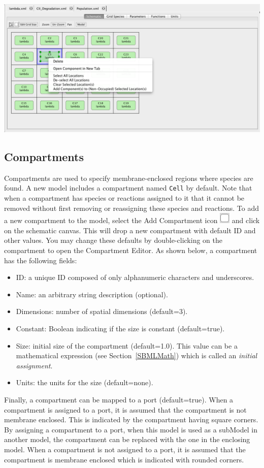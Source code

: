 \documentclass[titlepage,11pt]{article}
\begin{document}
\begin{center}
\includegraphics[width=140mm]{screenshots/gridRightButton}
\end{center}

\subsection{\label{Compartments}Compartments}

\noindent
Compartments are used to specify membrane-enclosed regions where species are found. A new model includes a compartment named {\tt Cell} by default.  Note that when a compartment has species or reactions assigned to it that it cannot be removed without first removing or reassigning these species and reactions.  To add a new compartment to the model, select the Add Compartment icon \includegraphics{../gui/icons/modelview/add_compartment_selected} and click on the schematic canvas.  This will drop a new compartment with default ID and other values.  You may change these defaults by double-clicking on the compartment to open the Compartment Editor.  
As shown below, a compartment has the following fields:
\begin{itemize}
\item ID: a unique ID composed of only alphanumeric characters and underscores.
\item Name: an arbitrary string description (optional).
\item Dimensions: number of spatial dimensions (default=3).
\item Constant: Boolean indicating if the size is constant (default=true).
\item Size: initial size of the compartment (default=1.0).  This value can be a mathematical expression (see Section~\ref{SBMLMath}) which is called an \emph{initial assignment}.
\item Units: the units for the size (default=none).
\end{itemize}
Finally, a compartment can be mapped to a port (default=true).  When a compartment is assigned to a port, it is assumed that the compartment is not membrane enclosed.  This is indicated by the compartment having square corners.  By assigning a compartment to a port, when this model is used as a subModel in another model, the compartment can be replaced with the one in the enclosing model.  When a compartment is not assigned to a port, it is assumed that the compartment is membrane enclosed which is indicated with rounded corners.
\end{document}

